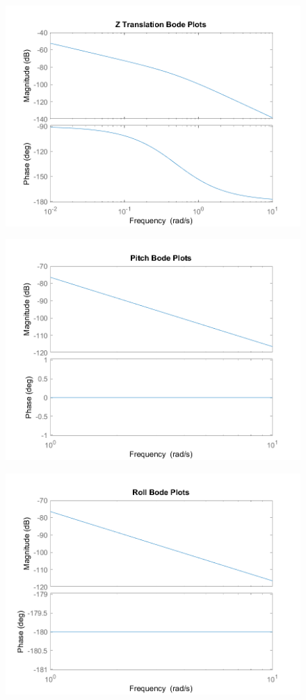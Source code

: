 \documentclass[12pt]{article}
\begin{document}
\begin{figure}[h]
\includegraphics[width=0.75\linewidth]{images/Z_bode.png}
\centering
\caption{}
\end{figure}

\begin{figure}[h]
\includegraphics[width=0.75\linewidth]{images/Pitch_bode.png}
\centering
\caption{}
\end{figure}

\begin{figure}[h]
\includegraphics[width=0.75\linewidth]{images/Roll_bode.png}
\centering
\caption{}
\end{figure}
\end{document}

